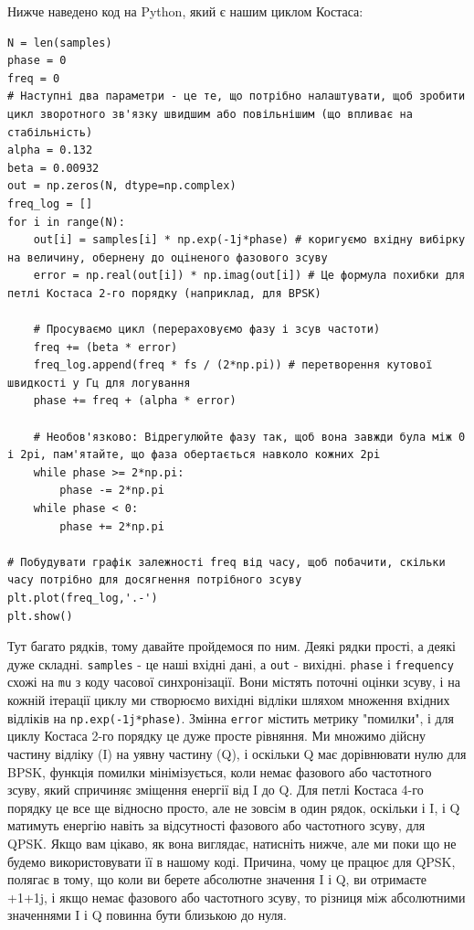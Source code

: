 Нижче наведено код на Python, який є нашим циклом Костаса:

\begin{Verbatim}[breaklines=true,breakanywhere=true,fontsize=\small]
N = len(samples)
phase = 0
freq = 0
# Наступні два параметри - це те, що потрібно налаштувати, щоб зробити цикл зворотного зв'язку швидшим або повільнішим (що впливає на стабільність)
alpha = 0.132
beta = 0.00932
out = np.zeros(N, dtype=np.complex)
freq_log = []
for i in range(N):
    out[i] = samples[i] * np.exp(-1j*phase) # коригуємо вхідну вибірку на величину, обернену до оціненого фазового зсуву
    error = np.real(out[i]) * np.imag(out[i]) # Це формула похибки для петлі Костаса 2-го порядку (наприклад, для BPSK)

    # Просуваємо цикл (перераховуємо фазу і зсув частоти)
    freq += (beta * error)
    freq_log.append(freq * fs / (2*np.pi)) # перетворення кутової швидкості у Гц для логування
    phase += freq + (alpha * error)

    # Необов'язково: Відрегулюйте фазу так, щоб вона завжди була між 0 і 2pi, пам'ятайте, що фаза обертається навколо кожних 2pi
    while phase >= 2*np.pi:
        phase -= 2*np.pi
    while phase < 0:
        phase += 2*np.pi

# Побудувати графік залежності freq від часу, щоб побачити, скільки часу потрібно для досягнення потрібного зсуву
plt.plot(freq_log,'.-')
plt.show()
\end{Verbatim}

Тут багато рядків, тому давайте пройдемося по ним. Деякі рядки прості, а
деякі дуже складні. \texttt{samples} - це наші вхідні дані, а
\texttt{out} - вихідні. \texttt{phase} і \texttt{frequency} схожі на
\texttt{mu} з коду часової синхронізації. Вони містять поточні оцінки
зсуву, і на кожній ітерації циклу ми створюємо вихідні відліки шляхом
множення вхідних відліків на \texttt{np.exp(-1j*phase)}. Змінна
\texttt{error} містить метрику "помилки", і для циклу Костаса 2-го
порядку це дуже просте рівняння. Ми множимо дійсну частину відліку (I)
на уявну частину (Q), і оскільки Q має дорівнювати нулю для BPSK,
функція помилки мінімізується, коли немає фазового або частотного зсуву,
який спричиняє зміщення енергії від I до Q. Для петлі Костаса 4-го
порядку це все ще відносно просто, але не зовсім в один рядок, оскільки
і I, і Q матимуть енергію навіть за відсутності фазового або частотного
зсуву, для QPSK. Якщо вам цікаво, як вона виглядає, натисніть нижче, але
ми поки що не будемо використовувати її в нашому коді. Причина, чому це
працює для QPSK, полягає в тому, що коли ви берете абсолютне значення I
і Q, ви отримаєте +1+1j, і якщо немає фазового або частотного зсуву, то
різниця між абсолютними значеннями I і Q повинна бути близькою до нуля.


